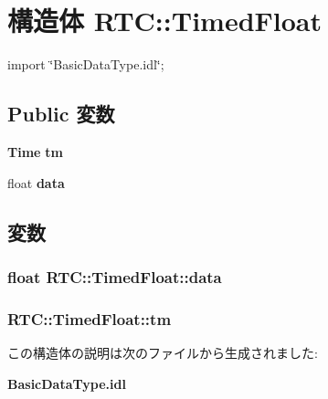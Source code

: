 \section{構造体 RTC::TimedFloat}
\label{structRTC_1_1TimedFloat}


{\ttfamily import \char`\"{}BasicDataType.idl\char`\"{};}

\subsection*{Public 変数}
\begin{DoxyCompactItemize}
\item 
{\bf Time} {\bf tm}
\item 
float {\bf data}
\end{DoxyCompactItemize}


\subsection{変数}
\subsubsection[{data}]{\setlength{\rightskip}{0pt plus 5cm}float {\bf RTC::TimedFloat::data}}\label{structRTC_1_1TimedFloat_ac071c97d322eda23f48c0f60d33fce28}
\subsubsection[{tm}]{ {\bf RTC::TimedFloat::tm}}\label{structRTC_1_1TimedFloat_afc52cd219182bd89ac8e76515db1aaea}


この構造体の説明は次のファイルから生成されました:\begin{DoxyCompactItemize}
\item 
{\bf BasicDataType.idl}\end{DoxyCompactItemize}
